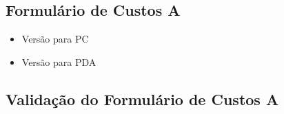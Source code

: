 \subsection{Formulário de Custos A}
\label{sec:alvos_custos_a}

\begin{itemize}

\item Versão para PC

\item Versão para PDA

\end{itemize}


\subsection{Validação do Formulário de Custos A}
\label{sec:validacao_custos_a}

